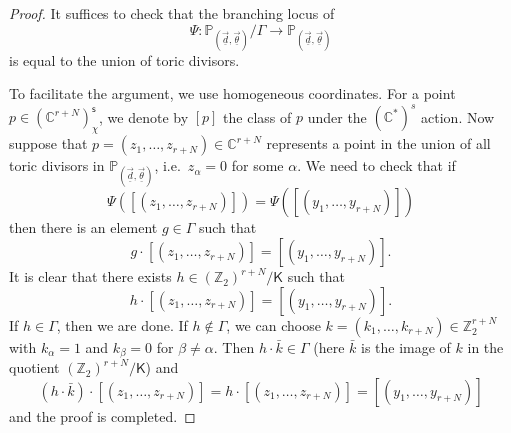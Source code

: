 \documentclass[12pt,a4paper,oneside]{amsart}
\numberwithin{equation}{section}
\theoremstyle{definition}
\theoremstyle{remark}
\begin{document}
\begin{proof}
    It suffices to check that the branching locus of
    \begin{equation*}
        \Psi\colon\mathbb{P}_{(\vec{\underline{d}}, \vec{\underline{\theta}})}
        \slash \Gamma \to 
        \mathbb{P}_{(\vec{\underline{d}}, \vec{\underline{\theta}})}
    \end{equation*}
    is equal to the union of toric divisors.

    To facilitate the argument, we use homogeneous coordinates.
    For a point \(p\in (\mathbb{C}^{r+N})^{\mathsf{s}}_{\chi}\), we denote by 
    \([p]\) the class of \(p\) under the \((\mathbb{C}^{\ast})^{s}\) action. Now suppose that \(p=(z_{1},\ldots,z_{r+N})\in \mathbb{C}^{r+N}\) represents a point in the union of all toric divisors in $\mathbb{P}_{(\vec{\underline{d}}, \vec{\underline{\theta}})}$, i.e.~\(z_{\alpha}=0\) for some \(\alpha\). We need to check that if 
    \begin{equation*}
        \Psi([(z_{1},\ldots,z_{r+N})])=\Psi([(y_{1},\ldots,y_{r+N})])
    \end{equation*}
    then there is an element \(g\in\Gamma\) such that
    \begin{equation*}
        g\cdot [(z_{1},\ldots,z_{r+N})]=[(y_{1},\ldots,y_{r+N})].
    \end{equation*}
    It is clear that there exists \(h\in (\mathbb{Z}_{2})^{r+N}\slash \mathsf{K}\)
    such that 
    \begin{equation*}
        h\cdot [(z_{1},\ldots,z_{r+N})]=[(y_{1},\ldots,y_{r+N})].
    \end{equation*}
    If \(h\in \Gamma\), then we are done. If \(h\notin \Gamma\), 
    we can choose \(k=(k_{1},\ldots,k_{r+N})\in \mathbb{Z}_{2}^{r+N}\)
    with \(k_{\alpha}=1\) and \(k_{\beta}=0\) for \(\beta\ne\alpha\).
    Then \(h\cdot\bar{k}\in \Gamma\) (here \(\bar{k}\) is the image of \(k\)
    in the quotient \((\mathbb{Z}_{2})^{r+N}\slash \mathsf{K}\)) and
    \begin{equation*}
        (h\cdot\bar{k})\cdot [(z_{1},\ldots,z_{r+N})]=
        h\cdot [(z_{1},\ldots,z_{r+N})]=[(y_{1},\ldots,y_{r+N})]
    \end{equation*}
    and the proof is completed.
\end{proof}
\end{document}
